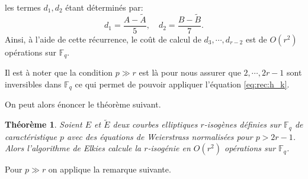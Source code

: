 \documentclass[10pt,a4paper]{book}
\theoremstyle{plain}
\newtheorem{thm}{Théorème}[chapter]
\theoremstyle{definition}
\theoremstyle{definition}
\theoremstyle{definition}
\theoremstyle{definition}
\theoremstyle{definition}
\theoremstyle{remark}
\theoremstyle{remark}
\theoremstyle{definition}
\begin{document}
les termes $d_1, d_2$ étant déterminés par:
\begin{equation}
d_1=\frac{A-\tilde{A}}{5}, \quad d_2={\frac{B-\tilde{B}}{7}}.
\end{equation}
Ainsi, à l'aide de cette récurrence, le coût de calcul de $d_3, \cdots , d_{r-2}$ est de $O(r^2)$ opérations sur $\mathbb{F}_q$. 

Il est à noter que la condition $p \gg r$ est là pour nous assurer que $2, 
\cdots, 2r-1$ sont inversibles dans $\mathbb{F}_q$ ce qui permet de pouvoir 
appliquer l'équation \eqref{eq:rec:h_k}.

On peut alors énoncer le théorème suivant.
\begin{thm}
Soient $E$ et $\tilde{E}$ deux courbes elliptiques $r$-isogènes définies sur
$\mathbb{F}_q$ de caractéristique $p$ avec des équations de Weierstrass 
normalisées pour $p>2r-1$. 
Alors l'algorithme de Elkies calcule la $r$-isogénie en $O(r^2)$ opérations sur
$\mathbb{F}_q$.
\end{thm}

Pour $p \gg r$ on applique la remarque suivante.
\end{document}
